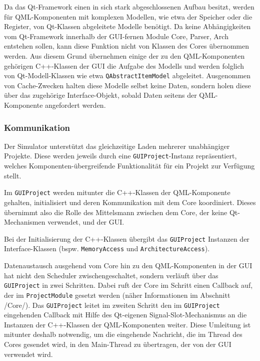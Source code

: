 Da das Qt-Framework einen in sich stark abgeschlossenen Aufbau besitzt, werden für QML-Komponenten mit komplexen Modellen, wie etwa der Speicher oder die Register, von Qt-Klassen abgeleitete Modelle benötigt. Da keine Abhängigkeiten vom Qt-Framework innerhalb der GUI-fernen Module Core, Parser, Arch entstehen sollen, kann diese Funktion nicht von Klassen des Cores übernommen werden. Aus diesem Grund übernehmen einige der zu den QML-Komponenten gehörigen C++-Klassen der GUI die Aufgabe des Modells und werden folglich von Qt-Modell-Klassen wie etwa \texttt{QAbstractItemModel} abgeleitet. Ausgenommen von Cache-Zwecken halten diese Modelle selbst keine Daten, sondern holen diese über das zugehörige Interface-Objekt, sobald Daten seitens der QML-Komponente angefordert werden.

\subsubsection{Kommunikation}

Der Simulator unterstützt das gleichzeitige Laden mehrerer unabhängiger Projekte. Diese werden jeweils durch eine \texttt{GUIProject}-Instanz repräsentiert, welches Komponenten-übergreifende Funktionalität für ein Projekt zur Verfügung stellt.

Im \texttt{GUIProject} werden mitunter die C++-Klassen der QML-Komponente gehalten, initialisiert und deren Kommunikation mit dem Core koordiniert.
Dieses übernimmt also die Rolle des Mittelsmann zwischen dem Core, der keine Qt-Mechanismen verwendet, und der GUI.

Bei der Initialisierung der C++-Klassen übergibt das \texttt{GUIProject} Instanzen der Interface-Klassen (bspw. \texttt{MemoryAccess} und \texttt{ArchitectureAccess}).

Datenaustausch ausgehend vom Core hin zu den QML-Komponenten in der GUI hat nicht den Scheduler zwischengeschaltet, sondern verläuft über das \texttt{GUIProject} in zwei Schritten. Dabei ruft der Core im Schritt einen Callback auf, der im \texttt{ProjectModule} gesetzt werden (näher Informationen im Abschnitt /Core/). Das \texttt{GUIProject} leitet im zweiten Schritt den im \texttt{GUIProject} eingehenden Callback mit Hilfe des Qt-eigenen Signal-Slot-Mechanismus an die Instanzen der C++-Klassen der QML-Komponenten weiter. Diese Umleitung ist mitunter deshalb notwendig, um die eingehende Nachricht, die im Thread des Cores gesendet wird, in den Main-Thread zu übertragen, der von der GUI verwendet wird.

